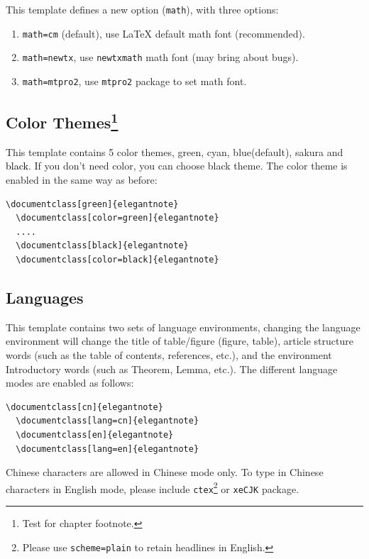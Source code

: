 \documentclass[en,hazy,screen,blue,14pt]{elegantnote}
\begin{document}
This template defines a new option (\lstinline{math}), with three options:

\begin{enumerate}
  \item \lstinline{math=cm} (default), use \LaTeX{} default math font (recommended).
  \item \lstinline{math=newtx}, use \lstinline{newtxmath} math font (may bring about bugs).
  \item \lstinline{math=mtpro2}, use \lstinline{mtpro2} package to set math font.
\end{enumerate}


\subsection[Color Themes]{Color Themes\footnote{Test for chapter footnote.}}

This template contains 5 color themes, \textcolor{egreen}{green}, \textcolor{ecyan}{cyan}, \textcolor{eblue}{blue}(default), \textcolor{sakura}{sakura} and \textcolor{black}{black}. If you don't need color, you can choose black theme. The color theme is enabled in the same way as before:
\begin{lstlisting}[frame=none]  
  \documentclass[green]{elegantnote}
  \documentclass[color=green]{elegantnote}
  ....
  \documentclass[black]{elegantnote}
  \documentclass[color=black]{elegantnote}
\end{lstlisting}


\subsection{Languages}

This template contains two sets of language environments, changing the language environment will change the title of table/figure (figure, table), article structure words (such as the table of contents, references, etc.), and the environment Introductory words (such as Theorem, Lemma, etc.). The different language modes are enabled as follows:
\begin{lstlisting}[frame=none]  
  \documentclass[cn]{elegantnote}
  \documentclass[lang=cn]{elegantnote}
  \documentclass[en]{elegantnote}
  \documentclass[lang=en]{elegantnote}
\end{lstlisting}

\begin{note}
Chinese characters are allowed in Chinese mode only. To type in Chinese characters in English mode, please include \lstinline{ctex}\footnote{Please use \lstinline{scheme=plain} to retain headlines in English.} or \lstinline{xeCJK} package.
\end{note}
\end{document}
